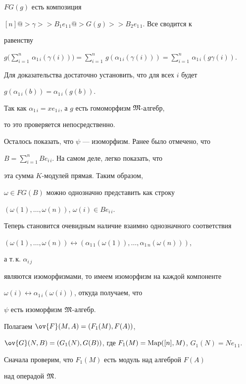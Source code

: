 \begin{pf}
$FG(g)$ есть композиция


$[n]@>{\gamma}>>B_1e_{1\,1}@>{G(g)}>> B_2e_{1\,1}$. Все сводится к


равенству


$g\Big(\sum\limits_{i=1}^n\,\alpha_{1\,i}(\gamma(i))\Big)=


\sum\limits_{i=1}^n\,g(\alpha_{1\,i}(\gamma(i)))=


\sum\limits_{i=1}^n\,\alpha_{1\,i}(g\gamma(i))$.


Для доказательства достаточно установить, что для всех $i$ будет


$g(\alpha_{1\,i}(b))=\alpha_{1\,i}(g(b))$.


Так как $\alpha_{1\,i}=x e_{1\,i}$, а $g$ есть гомоморфизм $\frak M$-алгебр,


то это проверяется непосредственно.





Осталось показать, что $\psi$ --- изоморфизм. Ранее было отмечено, что


$B=\sum\limits_{i=1}^n Be_{i\,i}$. На самом деле, легко показать, что


эта сумма $K$-модулей прямая. Таким образом,


$\omega\in FG(B)$ можно однозначно представить как строку


$(\omega(1),\dotsc, \omega(n))$, $\omega(i)\in B e_{i\,i}$.


Теперь становится очевидным наличие взаимно однозначного соответствия


$(\omega(1),\dotsc, \omega(n))\leftrightarrow


(\alpha_{1\,1}(\omega(1)),\dotsc, \alpha_{1\,n}(\omega(n)))$,


а т.\,к. $ \alpha_{i\,j}$


являются изоморфизмами, то имеем изоморфизм на каждой компоненте


$\omega(i)\leftrightarrow \alpha_{1\,i}(\omega(i))$, откуда получаем, что


$\psi$ есть изоморфизм $\frak M$-алгебр.





Полагаем $\ov{F}(M,A)=(F_1(M),F(A))$,


$\ov{G}(N,B)=(G_1(N),G(B))$, где $F_1(M)=\operatorname{Map}([n],M)$, $G_1(N)=Ne_{1\,1}$.


Сначала проверим, что $F_1(M)$ есть модуль над алгеброй $F(A)$


над операдой $\frak M$.



\end{pf}
